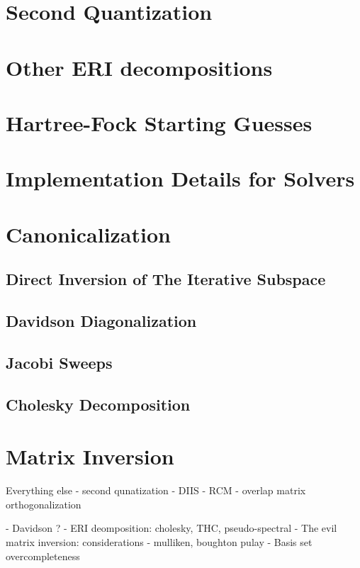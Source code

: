 \appendix
\chapter{Second Quantization}

\chapter{Other ERI decompositions \label{app:ERIDECOMP}}

\chapter{Hartree-Fock Starting Guesses \label{app:SCFGUESS}}

\chapter{Implementation Details for Solvers}

\chapter{Canonicalization \label{app:CANON}}

\section{Direct Inversion of The Iterative Subspace \label{sec:DIIS}}

\section{Davidson Diagonalization \label{sec:DAV}}

\section{Jacobi Sweeps \label{sec:LOCORB}}

\section{Cholesky Decomposition \label{sec:CHOLDEC}}

\chapter{Matrix Inversion \label{app:MATINV}}

Everything else
- second qunatization
- DIIS 
- RCM
- overlap matrix orthogonalization

- Davidson ? 
- ERI deomposition: cholesky, THC, pseudo-spectral
- The evil matrix inversion: considerations
- mulliken, boughton pulay
- Basis set overcompleteness